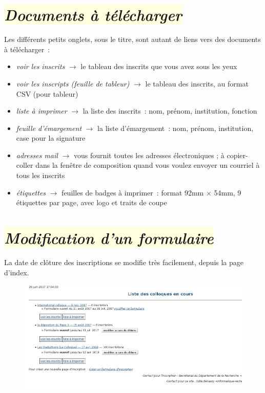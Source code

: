 \documentclass[10pt,a4paper]{article}
\newcommand{\jaunepale}[1]{\colorbox{LightYellow}{#1}}
\begin{document}
\section*{\jaunepale{\emph{Documents à télécharger}}}

Les différents petits onglets, sous le titre, sont autant de liens vers des documents à télécharger :

\begin{itemize}
  \item \emph{voir les inscrits} $\longrightarrow$ le tableau des inscrits que vous avez sous les yeux
  \item \emph{voir les inscripts (feuille de tableur)} $\longrightarrow$ le tableau des inscrits, au format CSV (pour tableur)
  \item \emph{liste à imprimer} $\longrightarrow$ la liste des inscrits : nom, prénom, institution, fonction
  \item \emph{feuille d'émargement} $\longrightarrow$ la liste d'émargement : nom, prénom, institution, case pour la signature
  \item \emph{adresses mail} $\longrightarrow$ vous fournit toutes les adresses électroniques ; à copier-coller dans la fenêtre de composition quand vous voulez envoyer un courriel à tous les inscrits
  \item \emph{étiquettes} $\longrightarrow$ feuilles de badges à imprimer : format 92mm $\times$ 54mm, 9 étiquettes par page, avec logo et traits de coupe
\end{itemize}

\newpage

\section*{\jaunepale{\emph{Modification d'un formulaire}}}

La date de clôture des inscriptions se modifie très facilement, depuis la page d'index.

\begin{figure}[h]
  \includegraphics[width=500px]{images/suivi-index-2}
 \end{figure}
\end{document}
